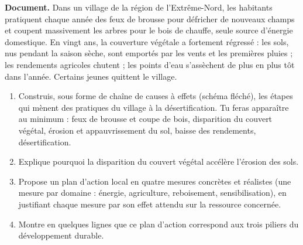 \documentclass[11pt]{article}
\begin{document}
\begin{exercice}
\textbf{Document.} Dans un village de la région de l'Extrême-Nord, les habitants pratiquent chaque année des feux de brousse pour défricher de nouveaux champs et coupent massivement les arbres pour le bois de chauffe, seule source d'énergie domestique. En vingt ans, la couverture végétale a fortement régressé : les sols, nus pendant la saison sèche, sont emportés par les vents et les premières pluies ; les rendements agricoles chutent ; les points d'eau s'assèchent de plus en plus tôt dans l'année. Certains jeunes quittent le village.

\begin{enumerate}
\item Construis, sous forme de chaîne de causes à effets (schéma fléché), les étapes qui mènent des pratiques du village à la désertification. Tu feras apparaître au minimum : feux de brousse et coupe de bois, disparition du couvert végétal, érosion et appauvrissement du sol, baisse des rendements, désertification.
\item Explique pourquoi la disparition du couvert végétal accélère l'érosion des sols.
\item Propose un plan d'action local en quatre mesures concrètes et réalistes (une mesure par domaine : énergie, agriculture, reboisement, sensibilisation), en justifiant chaque mesure par son effet attendu sur la ressource concernée.
\item Montre en quelques lignes que ce plan d'action correspond aux trois piliers du développement durable.
\end{enumerate}
\end{exercice}
\end{document}
